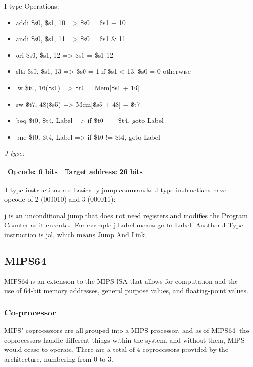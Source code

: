 \documentclass[
    parskip=half,
    fontsize=12pt,
    titlepage=firstiscover,
    toc=bibliography,
    numbers=endperiod
]{scrartcl}
\providecommand{\tightlist}{%
  \setlength{\itemsep}{0pt}\setlength{\parskip}{0pt}}
\begin{document}
I-type Operations:

\begin{itemize}
    \tightlist
    \item addi \$s0, \$s1, 10 =\textgreater{} \$s0 = \$s1 + 10
    \item andi \$s0, \$s1, 11 =\textgreater{} \$s0 = \$s1 \& 11
    \item ori \$s0, \$s1, 12 =\textgreater{} \$s0 = \$s1 \textbar{} 12
    \item slti \$s0, \$s1, 13 =\textgreater{} \$s0 = 1 if \$s1 \textless{} 13, \$s0 = 0 otherwise
    \item lw \$t0, 16(\$s1) =\textgreater{} \$t0 = Mem{[}\$s1 + 16{]}
    \item sw \$t7, 48(\$s5) =\textgreater{} Mem{[}\$s5 + 48{]} = \$t7
    \item beq \$t0, \$t4, Label =\textgreater{} if \$t0 == \$t4, goto Label
    \item bne \$t0, \$t4, Label =\textgreater{} if \$t0 != \$t4, goto Label
\end{itemize}

\emph{J-type:}

\begin{tabularx}{\textwidth}{@{}|c|C|@{}}
    \hline
    Opcode: 6 bits & Target address: 26 bits \\
    \hline
\end{tabularx}

J-type instructions are basically jump commands. J-type instructions
have opcode of 2 (000010) and 3 (000011):

j is an unconditional jump that does not need registers and modifies the
Program Counter as it executes. For example j Label means go to Label.
Another J-Type instruction is jal, which means Jump And Link.

\subsection{MIPS64}
\label{sec:mips64}

MIPS64 is an extension to the MIPS ISA that allows for computation and
the use of 64-bit memory addresses, general purpose values, and
floating-point values.

\subsubsection{Co-processor}

MIPS' coprocessors are all grouped into a MIPS processor, and as of
MIPS64, the coprocessors handle different things within the system, and
without them, MIPS would cease to operate. There are a total of 4
coprocessors provided by the architecture, numbering from 0 to 3.
\end{document}
